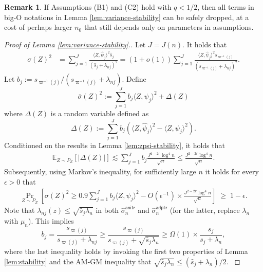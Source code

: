 \documentclass[aos]{imsart}
\renewcommand{\hat}{\widehat}
\renewcommand{\bar}{\overline}
\newcommand{\anitr}{\mathsf{anitr}}
\newcommand{\adptr}{\mathsf{adptr}}
\theoremstyle{plain}
\theoremstyle{definition}
\theoremstyle{definition}
\newtheorem{remark}{Remark}[section]
\begin{document}
\begin{appendix}
\begin{remark}
If Assumptions (B1) and (C2) hold with $q<1/2$, then all terms in big-O notations in Lemma \ref{lem:variance-stability} can be safely dropped, at a cost of perhaps larger $n_0$ that still depends only on parameters in assumptions.
\end{remark}

\begin{proof}[Proof of Lemma \ref{lem:variance-stability}.]
Let $J=J(n)$.
It holds that
\begin{align*}
\sigma(Z)^2 &= \sum_{j=1}^J \frac{\langle Z,\hat\psi_j\rangle^2\hat s_j}{(\hat s_j+\lambda_{nj})^2} = (1+o(1))\sum_{j=1}^J\frac{\langle Z,\hat\psi_j\rangle^2 s_{\varpi^{-1}(j)}}{(s_{\varpi^{-1}(j)}+\lambda_{nj})^2}.
\end{align*} 
{\color{orange}
Let $b_j := s_{\varpi^{-1}(j)}/(s_{\varpi^{-1}(j)}+\lambda_{nj}).$ Define
$$
\bar\sigma(Z)^2 := \sum_{j=1}^J b_j \langle Z,\psi_j\rangle^2+ \Delta(Z)
$$
where $\Delta(Z)$ is a random variable defined as
$$
\Delta(Z) := \sum_{j=1}^J b_j(\langle Z,\hat\psi_j\rangle^2-\langle Z,\psi_j\rangle^2).
$$
Conditioned on the results in Lemma \ref{lem:zpsi-stability}, it holds that
\begin{align*}
\mathbb E_{Z\sim P_Z}[|\Delta(Z)|] \lesssim \sum_{j=1}^J b_j\frac{J^{1-2r}\log^4 n}{\sqrt{n}}\leq \frac{J^{2-2r}\log^4 n}{\sqrt{n}}.
\end{align*}
Subsequently, using Markov's inequality, for sufficiently large $n$ it holds for every $\epsilon>0$ that
\begin{align}
\Pr_{Z\sim P_Z}\left[\sigma(Z)^2\geq 0.9\sum_{j=1}^Jb_j\langle Z,\psi_j\rangle^2 - O(\epsilon^{-1})\times\frac{J^{2-2r}\log^4 n}{\sqrt{n}}\right] \;\geq\; 1-\epsilon.
\label{eq:proof-variance-stability-1}
\end{align}
Note that $\lambda_{nj}(z)\leq \sqrt{\hat s_j\lambda_n}$ in both $\hat\sigma_n^{\anitr}$ and $\hat\sigma_n^{\adptr}$ (for the latter, replace $\lambda_n$ with $\mu_n$).
This implies
$$
b_j = \frac{s_{\varpi(j)}}{s_{\varpi(j)}+\lambda_{nj}} \geq \frac{s_{\varpi(j)}}{s_{\varpi(j)}+\sqrt{\hat s_j\lambda_n}} \geq \Omega(1)\times \frac{s_j}{s_j+\lambda_n},
$$
where the last inequality holds by invoking the first two properties of Lemma \ref{lem:stability} and the AM-GM inequality that $\sqrt{\hat s_j\lambda_n} \leq (\hat s_j+\lambda_n)/2$.
}
\end{proof}
\end{appendix}
\end{document}
